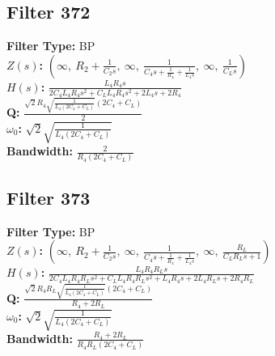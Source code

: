 \documentclass{article}
\begin{document}
\subsection*{Filter 372}
\textbf{Filter Type:} BP \\ 
\textbf{$Z(s)$:} $\left( \infty, \  R_{2} + \frac{1}{C_{2} s}, \  \infty, \  \frac{1}{C_{4} s + \frac{1}{R_{4}} + \frac{1}{L_{4} s}}, \  \infty, \  \frac{1}{C_{L} s}\right)$ \\ 
\textbf{$H(s)$:} $\frac{L_{4} R_{4} s}{2 C_{4} L_{4} R_{4} s^{2} + C_{L} L_{4} R_{4} s^{2} + 2 L_{4} s + 2 R_{4}}$ \\ 
\textbf{Q:} $\frac{\sqrt{2} R_{4} \sqrt{\frac{1}{L_{4} \left(2 C_{4} + C_{L}\right)}} \left(2 C_{4} + C_{L}\right)}{2}$ \\ 
\textbf{$\omega_0$:} $\sqrt{2} \sqrt{\frac{1}{L_{4} \left(2 C_{4} + C_{L}\right)}}$ \\ 
\textbf{Bandwidth:} $\frac{2}{R_{4} \left(2 C_{4} + C_{L}\right)}$ \\ 
\subsection*{Filter 373}
\textbf{Filter Type:} BP \\ 
\textbf{$Z(s)$:} $\left( \infty, \  R_{2} + \frac{1}{C_{2} s}, \  \infty, \  \frac{1}{C_{4} s + \frac{1}{R_{4}} + \frac{1}{L_{4} s}}, \  \infty, \  \frac{R_{L}}{C_{L} R_{L} s + 1}\right)$ \\ 
\textbf{$H(s)$:} $\frac{L_{4} R_{4} R_{L} s}{2 C_{4} L_{4} R_{4} R_{L} s^{2} + C_{L} L_{4} R_{4} R_{L} s^{2} + L_{4} R_{4} s + 2 L_{4} R_{L} s + 2 R_{4} R_{L}}$ \\ 
\textbf{Q:} $\frac{\sqrt{2} R_{4} R_{L} \sqrt{\frac{1}{L_{4} \left(2 C_{4} + C_{L}\right)}} \left(2 C_{4} + C_{L}\right)}{R_{4} + 2 R_{L}}$ \\ 
\textbf{$\omega_0$:} $\sqrt{2} \sqrt{\frac{1}{L_{4} \left(2 C_{4} + C_{L}\right)}}$ \\ 
\textbf{Bandwidth:} $\frac{R_{4} + 2 R_{L}}{R_{4} R_{L} \left(2 C_{4} + C_{L}\right)}$ \\ 
\end{document}
